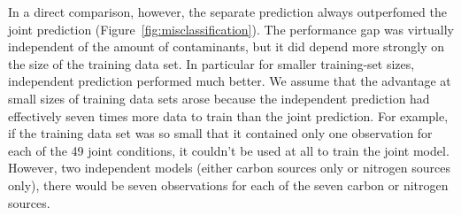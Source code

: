 \documentclass[12pt]{article}
\begin{document}
In a direct comparison, however, the separate prediction always outperfomed the joint prediction (Figure~\ref{fig:misclassification}). The performance gap was virtually independent of the amount of contaminants, but it did depend more strongly on the size of the training data set. In particular for smaller training-set sizes, independent prediction performed much better. We assume that the advantage at small sizes of training data sets arose because the independent prediction had effectively seven times more data to train than the joint prediction. For example, if the training data set was so small that it contained only one observation for each of the 49 joint conditions, it couldn't be used at all to train the joint model. However, two independent models (either carbon sources only or nitrogen sources only), there would be seven observations for each of the seven carbon or nitrogen sources.
\end{document}
